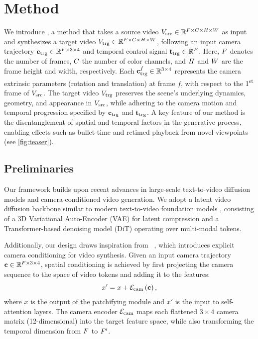 \section{Method}
\label{sec:method}

We introduce \nameMethod, a method that takes a source video $V_{\text{src}} \in \mathbb{R}^{F \times C \times H \times W}$ as input and synthesizes a target video $V_{\text{trg}} \in \mathbb{R}^{F \times C \times H \times W}$, following an input camera trajectory $\mathbf{c}_{\text{trg}}\in \mathbb{R}^{F \times 3 \times 4}$ and temporal control signal $\mathbf{t}_{\text{trg}} \in \mathbb{R}^{F}$.
Here, $F$ denotes the number of frames, $C$ the number of color channels, 
and $H$ and $W$ are the frame height and width, respectively. 
Each $\mathbf{c}_{\text{trg}}^{f} \in \mathbb{R}^{3 \times 4}$ represents the camera extrinsic 
parameters (rotation and translation) at frame $f$, with respect to the 1\textsuperscript{st} frame of  $V_{\text{src}}$.
The target video $V_{\text{trg}}$ preserves the scene’s underlying dynamics, geometry, and appearance in $V_{\text{src}}$, while adhering to the camera motion and temporal progression specified by $\mathbf{c}_{\text{trg}}$ and $\mathbf{t}_{\text{trg}}$.
A key feature of our method is the disentanglement of spatial and temporal factors in the generative process, enabling effects such as bullet-time and retimed playback from novel viewpoints (see \cref{fig:teaser}).



\subsection{Preliminaries}
Our framework builds upon recent advances in large-scale text-to-video diffusion models and camera-conditioned video generation. 
We adopt a latent video diffusion backbone similar to modern text-to-video foundation models \cite{wan2025}, consisting of a 3D Variational Auto-Encoder (VAE) for latent compression and a Transformer-based denoising model (DiT) operating over multi-modal tokens. 

Additionally, our design draws inspiration from \recammaster~\cite{Bai2025}, which introduces explicit camera conditioning for video synthesis. 
Given an input camera trajectory $\mathbf{c} \in \mathbb{R}^{F \times 3 \times 4}$, 
spatial conditioning is achieved by first projecting the camera sequence to the space of video tokens and adding it to the features:
\begin{equation}
x' = x + \mathcal{E}_\text{cam}\left(\mathbf{c}\right),
\label{eq:camera-condition}
\end{equation}
where $x$ is the output of the patchifying module and $x'$ is the input to self-attention layers. 
The camera encoder $\mathcal{E}_\text{cam}$ maps each flattened $3 \times 4$ camera matrix (12-dimensional) into the target feature space, while also transforming the temporal dimension from $F$ to $F'$.

